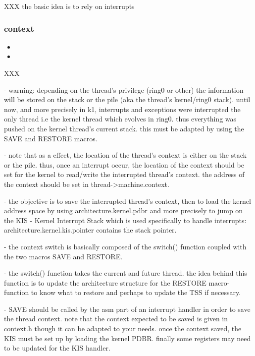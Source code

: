 XXX the basic idea is to rely on interrupts

\subsubsection*{context}

\begin{itemize}
  \item
  \item
\end{itemize}

XXX

- warning: depending on the thread's privilege (ring0 or other) the information
 will be stored on the stack or the pile (aka the thread's kernel/ring0 stack).
 until now, and more precisely in k1, interrupts and exceptions were
 interrupted the only thread i.e the kernel thread which evolves in ring0.
 thus everything was pushed on the kernel thread's current stack. this must
 be adapted by using the SAVE and RESTORE macros.

- note that as a effect, the location of the thread's context is either
 on the stack or the pile. thus, once an interrupt occur, the location of
 the context should be set for the kernel to read/write the interrupted
 thread's context. the address of the context should be set in
 thread->machine.context.

- the objective is to save the interrupted thread's context, then to
 load the kernel address space by using architecture.kernel.pdbr and
 more precisely to jump on the KIS - Kernel Interrupt Stack which is used
 specifically to handle interrupts: architecture.kernel.kis.pointer contains
 the stack pointer.

- the context switch is basically composed of the switch() function coupled
 with the two macros SAVE and RESTORE.

- the switch() function takes the current and future thread. the idea
 behind this function is to update the architecture structure for the
 RESTORE macro-function to know what to restore and perhaps to update the
 TSS if necessary.

- SAVE should be called by the asm part of an interrupt handler in
 order to save the thread context. note that the context expected to be
 saved is given in context.h though it can be adapted to your needs. once
 the context saved, the KIS must be set up by loading the kernel PDBR.
 finally some registers may need to be updated for the KIS handler.


